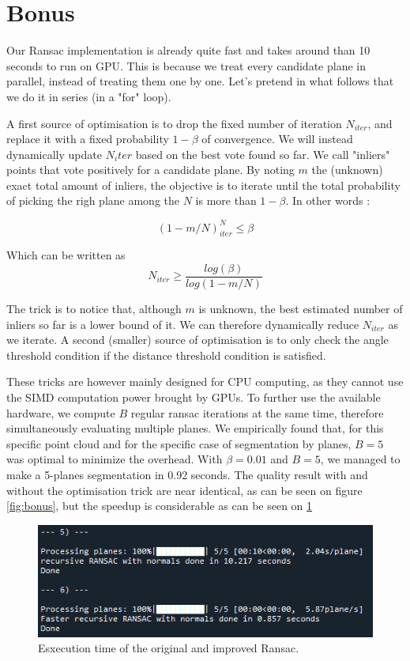 \documentclass[a4paper]{article}
\begin{document}
\section*{Bonus}
Our Ransac implementation is already quite fast and takes around than 10 seconds to run on GPU.
This is because we treat every candidate plane in parallel, instead of treating them one by one. Let's pretend in what follows that we do it in series (in a "for" loop).

A first source of optimisation is to drop the fixed number of iteration $N_{iter}$, and replace it with a fixed probability $1 - \beta$ of convergence.
We will instead dynamically update $N_iter$ based on the best vote found so far.
We call "inliers" points that vote positively for a candidate plane. By noting $m$ the (unknown) exact total amount of inliers,
the objective is to iterate until the total probability of picking the righ plane among the $N$ is more than $1 - \beta$. In other words :

$$
(1 - m/N)^N_{iter} \leq \beta
$$

Which can be written as 
$$
N_{iter} \geq \frac{log(\beta)} {log(1-m/N)}
$$


The trick is to notice that, although $m$ is unknown, the best estimated number of inliers so far is a lower bound of it. We can therefore dynamically reduce $N_{iter}$ as we iterate.
A second (smaller) source of optimisation is to only check the angle threshold condition if the distance threshold condition is satisfied.

These tricks are however mainly designed for CPU computing, as they cannot use the SIMD computation power brought by GPUs. To further use the available hardware, we compute $B$ regular ransac iterations at the same time, therefore simultaneously evaluating multiple planes.
We empirically found that, for this specific point cloud and for the specific case of segmentation by planes, $B=5$ was optimal to minimize the overhead.
With $\beta = 0.01$ and $B=5$, we managed to make a 5-planes segmentation in 0.92 seconds. The quality result with and without the optimisation trick are near identical, as can be seen on figure \ref{fig:bonus}, but the speedup is considerable as can be seen on
\ref{fig:bonus_1}

\begin{figure}[ht]
    \centering
    \includegraphics[width=0.3\linewidth]{figures/bonus.png}
    \caption{Esxecution time of the original and improved Ransac.}
    \label{fig:bonus_1}
\end{figure}
\end{document}
